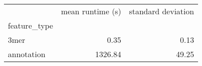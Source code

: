 \begin{tabular}{lrr}
\toprule
 & mean runtime (s) & standard deviation \\
feature_type &  &  \\
\midrule
3mer & 0.35 & 0.13 \\
annotation & 1326.84 & 49.25 \\
\bottomrule
\end{tabular}
